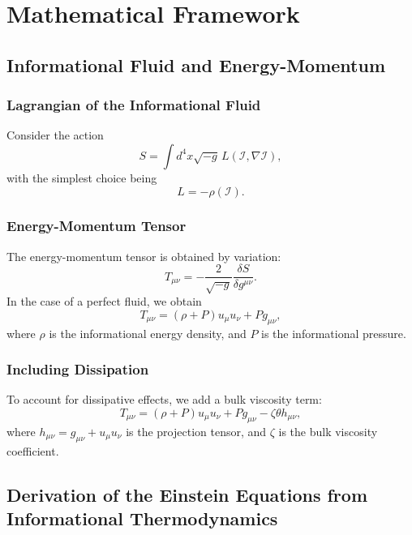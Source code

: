 \documentclass[12pt,a4paper]{book}
\newcommand{\I}{\mathcal{I}}
\begin{document}
\part{Mathematical Framework}

\chapter{Informational Fluid and Energy-Momentum}

\section{Lagrangian of the Informational Fluid}

Consider the action
\begin{equation}
    S = \int d^4x \sqrt{-g} \, L(\I, \nabla\I),
\end{equation}
with the simplest choice being
\begin{equation}
    L = -\rho(\I).
\end{equation}

\section{Energy-Momentum Tensor}

The energy-momentum tensor is obtained by variation:
\begin{equation}
    T_{\mu\nu} = -\frac{2}{\sqrt{-g}} \frac{\delta S}{\delta g^{\mu\nu}}.
\end{equation}
In the case of a perfect fluid, we obtain
\begin{equation}
    T_{\mu\nu} = (\rho + P) u_\mu u_\nu + P g_{\mu\nu},
\end{equation}
where $\rho$ is the informational energy density, and $P$ is the informational pressure.

\section{Including Dissipation}

To account for dissipative effects, we add a bulk viscosity term:
\begin{equation}
    T_{\mu\nu} = (\rho + P)u_\mu u_\nu + P g_{\mu\nu} - \zeta \theta h_{\mu\nu},
\end{equation}
where $h_{\mu\nu}=g_{\mu\nu}+u_\mu u_\nu$ is the projection tensor, and $\zeta$ is the bulk viscosity coefficient.

\chapter{Derivation of the Einstein Equations from Informational Thermodynamics}
\end{document}
